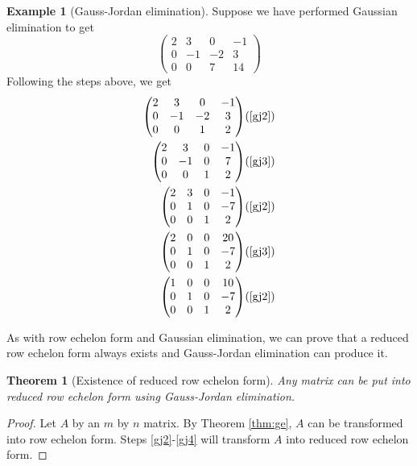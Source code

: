 \documentclass[12pt,reqno]{amsart}
\newtheorem{theorem}{Theorem}[section]
\theoremstyle{definition}
\newtheorem{example}{Example}[section]
\begin{document}
\begin{example}[Gauss-Jordan elimination]
  Suppose we have performed Gaussian elimination to get
  \[ \begin{pmatrix}
    2 & 3 & 0 & -1 \\
    0 & -1 & -2 & 3 \\
    0 & 0 & 7 & 14 
  \end{pmatrix} 
  \]
  Following the steps above, we get
  \begin{align*}
    \begin{pmatrix}
      2 & 3 & 0 & -1 \\
      0 & -1 & -2 & 3 \\
      0 & 0 & 1 & 2 
    \end{pmatrix} & (\text{\ref{gj2}}) \\
    \begin{pmatrix}
      2 & 3 & 0 & -1 \\
      0 & -1 & 0 & 7 \\
      0 & 0 & 1 & 2 
    \end{pmatrix} & (\text{\ref{gj3}}) \\
    \begin{pmatrix}
      2 & 3 & 0 & -1 \\
      0 & 1 & 0 & -7 \\
      0 & 0 & 1 & 2 
    \end{pmatrix} & (\text{\ref{gj2}}) \\
    \begin{pmatrix}
      2 & 0 & 0 & 20 \\
      0 & 1 & 0 & -7 \\
      0 & 0 & 1 & 2 
    \end{pmatrix} & (\text{\ref{gj3}}) \\
    \begin{pmatrix}
      1 & 0 & 0 & 10 \\
      0 & 1 & 0 & -7 \\
      0 & 0 & 1 & 2 
    \end{pmatrix} & (\text{\ref{gj2}}) 
  \end{align*}
\end{example}

As with row echelon form and Gaussian elimination, we can prove that
a reduced row echelon form always exists and Gauss-Jordan elimination
can produce it.
\begin{theorem}[Existence of reduced row echelon form]\label{thm:gj}
  Any matrix can be put into reduced row echelon form using
  Gauss-Jordan elimination.
\end{theorem}
\begin{proof}
  Let $A$ by an $m$ by $n$ matrix. By Theorem \ref{thm:ge}, $A$ can
  be transformed into row echelon form. Steps \ref{gj2}-\ref{gj4} will
  transform $A$ into reduced row echelon form. 
\end{proof}
\end{document}
